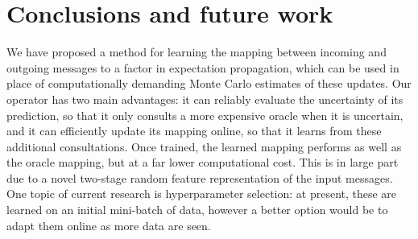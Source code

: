 \documentclass[english]{article}
\theoremstyle{plain}
\theoremstyle{plain}
\begin{document}
\section{Conclusions and future work\label{sec:Conclusions-and-Future} }

We have proposed a method for learning the mapping between incoming and outgoing
messages to a factor in expectation propagation, which can be used
in place of computationally demanding Monte Carlo estimates of these updates.
Our operator has two main advantages: it can reliably evaluate the uncertainty of its prediction,
so that it only consults a more expensive oracle when it is uncertain,
and it can efficiently update its mapping online, so that it learns
from these additional consultations. Once trained, the learned mapping
performs as well as the oracle mapping, but at a far lower computational cost.
This is in large part due to a novel two-stage random feature representation of the input
messages. One topic of current research is hyperparameter selection:
at present, these are learned on an initial mini-batch of data, however
a better option would be to adapt them online as more data are seen.










\end{document}

